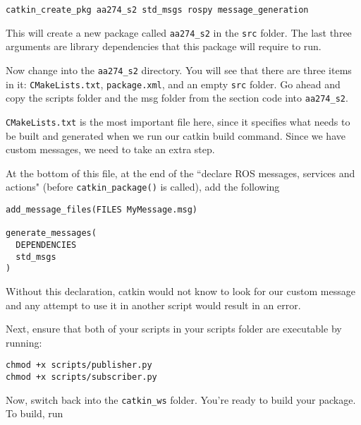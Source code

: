 \begin{lstlisting}
catkin_create_pkg aa274_s2 std_msgs rospy message_generation
\end{lstlisting}

This will create a new package called \texttt{aa274\_s2} in the \texttt{src} folder. The last three arguments are library dependencies that this package will require to run.

Now change into the \texttt{aa274\_s2} directory. You will see that there are three items in it: \texttt{CMakeLists.txt}, \texttt{package.xml}, and an empty \texttt{src} folder. Go ahead and copy the scripts folder and the msg folder from the section code into \texttt{aa274\_s2}.


\texttt{CMakeLists.txt} is the most important file here, since it specifies what needs to be built and generated when we run our catkin build command. Since we have custom messages, we need to take an extra step.

At the bottom of this file, at the end of the ``declare ROS messages, services and actions" (before \texttt{catkin\_package()} is called), add the following

\begin{lstlisting}
add_message_files(FILES MyMessage.msg)

generate_messages(
  DEPENDENCIES
  std_msgs
)
\end{lstlisting}

Without this declaration, catkin would not know to look for our custom message and any attempt to use it in another script would result in an error.

Next, ensure that both of your scripts in your scripts folder are executable by running:

\begin{lstlisting}
chmod +x scripts/publisher.py
chmod +x scripts/subscriber.py
\end{lstlisting}

Now, switch back into the \texttt{catkin\_ws} folder. You're ready to build your package. To build, run

